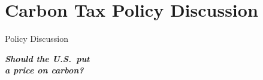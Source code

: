 \documentclass[9pt,english,aspectratio=169]{beamer}
\begin{document}
\section{Carbon Tax Policy Discussion}

\begin{frame}{Policy Discussion}

  \vspace{2em}
  {\Huge\textbf{\textit{Should the U.S.\ put\\a price on carbon?}}}

\end{frame}

\end{document}

